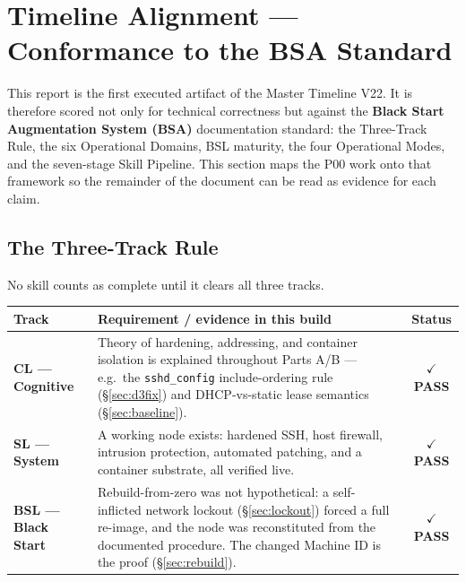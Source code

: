 \documentclass[11pt,a4paper]{article}
\newcommand{\pass}{\textcolor{okgreen}{\textbf{$\checkmark$ PASS}}}
\begin{document}
\tableofcontents
\clearpage

\section{Timeline Alignment — Conformance to the BSA Standard}
This report is the first executed artifact of the Master Timeline V22. It is
therefore scored not only for technical correctness but against the
\textbf{Black Start Augmentation System (BSA)} documentation standard: the
Three-Track Rule, the six Operational Domains, BSL maturity, the four
Operational Modes, and the seven-stage Skill Pipeline. This section maps the
P00 work onto that framework so the remainder of the document can be read as
evidence for each claim.

\subsection{The Three-Track Rule}
No skill counts as complete until it clears all three tracks.

\begin{longtable}{@{}p{2.4cm} p{8.4cm} c@{}}
\toprule
\textbf{Track} & \textbf{Requirement / evidence in this build} & \textbf{Status}\\
\midrule\endhead
\textbf{CL — Cognitive} & Theory of hardening, addressing, and container isolation is
explained throughout Parts A/B — e.g.\ the \texttt{sshd\_config} include-ordering
rule (§\ref{sec:d3fix}) and DHCP-vs-static lease semantics (§\ref{sec:baseline}). & \pass\\
\addlinespace
\textbf{SL — System} & A working node exists: hardened SSH, host firewall,
intrusion protection, automated patching, and a container substrate, all
verified live. & \pass\\
\addlinespace
\textbf{BSL — Black Start} & Rebuild-from-zero was not hypothetical: a self-inflicted
network lockout (§\ref{sec:lockout}) forced a full re-image, and the node was
reconstituted from the documented procedure. The changed Machine ID is the proof
(§\ref{sec:rebuild}). & \pass\\
\bottomrule
\end{longtable}
\end{document}
